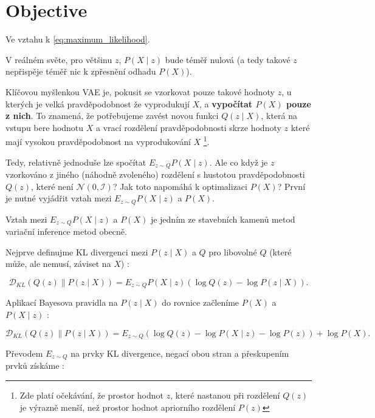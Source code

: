 \section{Objective}

Ve vztahu k \autoref{eq:maximum_likelihood}.

V reálném světe, pro většinu $z$, $P(X\mid z)$ bude téměř nulová (a tedy takové $z$ nepřispěje téměř nic k zpřesnění odhadu $P(X)$). \cite{Doersch2021}

Klíčovou myšlenkou VAE je, pokusit se vzorkovat pouze takové hodnoty $z$, u kterých je velká pravděpodobnost že vyprodukují $X$, a \textbf{vypočítat $P(X)$ pouze z nich}.
To znamená, že potřebujeme zavést novou funkci $Q(z\mid X)$, která na vstupu bere hodnotu $X$ a vrací rozdělení pravděpodobnosti skrze hodnoty $z$ které mají vysokou pravděpodobnost na vyprodukování $X$ \footnote{Zde platí očekávání, že prostor hodnot $z$, které nastanou při rozdělení $Q(z)$ je výrazně menší, než prostor hodnot apriorního rozdělení $P(z)$}. \cite{Doersch2021}

Tedy, relativně jednoduše lze spočítat $E_{z \sim Q}P(X \mid z)$. Ale co když je $z$ vzorkováno z jiného (náhodně zvoleného) rozdělení s hustotou pravděpodobnosti $Q(z)$, které není $\mathcal{N(0, I)}$? Jak toto napomáhá k optimalizaci $P(X)$? První je nutné vyjádřit vztah mezi $E_{z \sim Q}P(X\mid z)$ a $P(X)$. \cite{Doersch2021}

Vztah mezi $E_{z \sim Q}P(X \mid z)$ a $P(X)$ je jedním ze stavebních kamenů metod variační inference metod obecně. \cite{Doersch2021}

Nejprve definujme KL divergenci mezi $P(z\mid X)$ a $Q$ pro libovolné $Q$ (které může, ale nemusí, záviset na $X$) \cite{Doersch2021}:

\begin{equation}
    \mathcal{D}_{KL}(Q(z) \parallel P(z\mid X)) = E_{z \sim Q}P(X \mid z)(\log Q(z) - \log P(z\mid X)).
\end{equation}

Aplikací Bayesova pravidla na $P(z \mid X)$ do rovnice začleníme $P(X)$ a $P(X \mid z)$ \cite{Doersch2021}:

\begin{equation}
    \mathcal{D}_{KL}(Q(z)\parallel P(z\mid X)) = E_{z \sim Q}(\log Q(z) - \log P(X \mid z) - \log P(z)) + \log P(X).
\end{equation}

Převodem $E_{z \sim Q}$ na prvky KL divergence, negací obou stran a přeskupením prvků získáme \cite{Doersch2021}:


